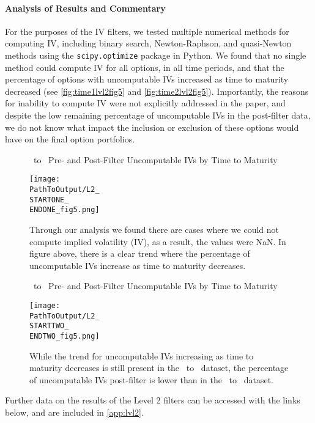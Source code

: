 \paragraph{Analysis of Results and Commentary}
For the purposes of the IV filters, we tested multiple numerical methods for computing IV, including binary search, Newton-Raphson, and quasi-Newton methods using the \texttt{scipy.optimize} package in Python. We found that no single method could compute IV for all options, in all time periods, and that the percentage of options with uncomputable IVs increased as time to maturity decreased (see \autoref{fig:time1lvl2fig5} and \autoref{fig:time2lvl2fig5}). Importantly, the reasons for inability to compute IV were not explicitly addressed in the paper, and despite the low remaining percentage of uncomputable IVs in the post-filter data, we do not know what impact the inclusion or exclusion of these options would have on the final option portfolios. 


\vspace{20pt}
\begin{figure}[H] %
  \centering
  \caption{\STARTONE\ to \ENDONE\ Pre- and Post-Filter Uncomputable IVs by Time to Maturity}
  \texttt{[image: \\PathToOutput/L2\_\\STARTONE\_\\ENDONE\_fig5.png]}
  \caption*{Through our analysis we found there are cases where we could not compute implied volatility (IV), as a result, the values were NaN. In figure above, there is a clear trend where the percentage of uncomputable IVs increase as time to maturity decreases.}
  \label{fig:time1lvl2fig5}
\end{figure}

\begin{figure}[H] %
  \centering
  \caption{\STARTTWO\ to \ENDTWO\ Pre- and Post-Filter Uncomputable IVs by Time to Maturity}
  \texttt{[image: \\PathToOutput/L2\_\\STARTTWO\_\\ENDTWO\_fig5.png]}
  \caption*{While the trend for uncomputable IVs increasing as time to maturity decreases is still present in the \STARTTWO\ to \ENDTWO\ dataset, the percentage of uncomputable IVs post-filter is lower than in the \STARTONE\ to \ENDONE\ dataset.}
 \label{fig:time2lvl2fig5}
\end{figure}

Further data on the results of the Level 2 filters can be accessed with the links below, and are included in \autoref{app:lvl2}.

